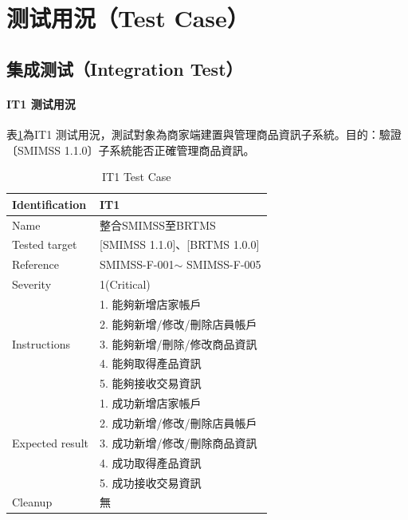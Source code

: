 		\section{测试用況（Test Case）}
			\subsection{集成测试（Integration Test）}
				
			\paragraph{IT1 测试用況}
				表\ref{IT1TestCase}為IT1 测试用況，測試對象為商家端建置與管理商品資訊子系統。目的：驗證〔SMIMSS 1.1.0〕子系統能否正確管理商品資訊。

				\begin{table}[htbp]
				\centering
				\caption{IT1 Test Case}
				\label{IT1TestCase}
				\begin{tabular}{|l|l|}
				\hline
				Identification & IT1 \\ \hline
				Name & 整合SMIMSS至BRTMS \\ \hline
				Tested target & {[}SMIMSS 1.1.0{]}、{[}BRTMS 1.0.0{]} \\ \hline
				Reference & SMIMSS-F-001$\sim$ SMIMSS-F-005 \\ \hline
				Severity & 1(Critical) \\ \hline
				\multirow{5}{*}{Instructions} & 1.     能夠新增店家帳戶 \\ \cline{2-2} 
				 & 2.     能夠新增/修改/刪除店員帳戶 \\ \cline{2-2} 
				 & 3.     能夠新增/刪除/修改商品資訊 \\ \cline{2-2} 
				 & 4.     能夠取得產品資訊 \\ \cline{2-2} 
				 & 5.     能夠接收交易資訊 \\ \hline
				\multirow{5}{*}{Expected result} & 1.     成功新增店家帳戶 \\ \cline{2-2} 
				 & 2.     成功新增/修改/刪除店員帳戶 \\ \cline{2-2} 
				 & 3.     成功新增/修改/刪除商品資訊 \\ \cline{2-2} 
				 & 4.     成功取得產品資訊 \\ \cline{2-2} 
				 & 5.     成功接收交易資訊 \\ \hline
				Cleanup & 無 \\ \hline
				\end{tabular}
				\end{table}


